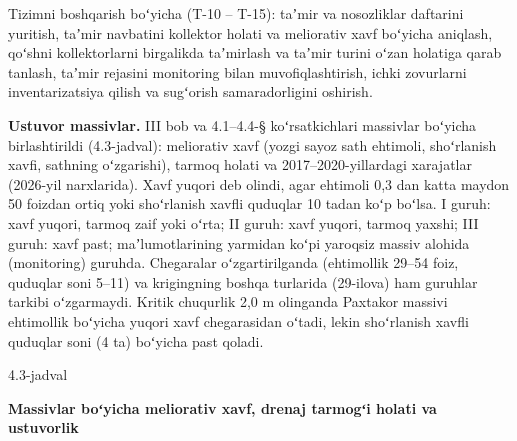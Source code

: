\documentclass[14pt,a4paper,oneside]{extreport}
\newcommand{\oakilovanom}[1]{{\centering\setstretch{1}\bfseries #1\par}\nopagebreak\vspace{2pt}}
\newcommand{\oakjadvalnum}[1]{\par\Needspace{12\baselineskip}\vspace{2pt}\noindent\hfill #1\par\nopagebreak}
\begin{document}
Tizimni boshqarish boʻyicha (T-10 -- T-15): taʼmir va nosozliklar
daftarini yuritish, taʼmir navbatini kollektor holati va meliorativ xavf
boʻyicha aniqlash, qoʻshni kollektorlarni birgalikda taʼmirlash va
taʼmir turini oʻzan holatiga qarab tanlash, taʼmir rejasini monitoring
bilan muvofiqlashtirish, ichki zovurlarni inventarizatsiya qilish va
sugʻorish samaradorligini oshirish.

\textbf{Ustuvor massivlar.} III bob va 4.1--4.4-§ koʻrsatkichlari
massivlar boʻyicha birlashtirildi (4.3-jadval): meliorativ xavf (yozgi
sayoz sath ehtimoli, shoʻrlanish xavfi, sathning oʻzgarishi), tarmoq
holati va 2017--2020-yillardagi xarajatlar (2026-yil narxlarida). Xavf
yuqori deb olindi, agar ehtimoli 0,3 dan katta maydon 50 foizdan ortiq
yoki shoʻrlanish xavfli quduqlar 10 tadan koʻp boʻlsa. I guruh: xavf
yuqori, tarmoq zaif yoki oʻrta; II guruh: xavf yuqori, tarmoq yaxshi;
III guruh: xavf past; maʼlumotlarining yarmidan koʻpi yaroqsiz massiv
alohida (monitoring) guruhda. Chegaralar oʻzgartirilganda (ehtimollik
29--54 foiz, quduqlar soni 5--11) va krigingning boshqa turlarida
(29-ilova) ham guruhlar tarkibi oʻzgarmaydi. Kritik chuqurlik 2,0 m
olinganda Paxtakor massivi ehtimollik boʻyicha yuqori xavf chegarasidan
oʻtadi, lekin shoʻrlanish xavfli quduqlar soni (4 ta) boʻyicha past
qoladi.

\oakjadvalnum{4.3-jadval}

\oakilovanom{\textbf{Massivlar boʻyicha meliorativ xavf, drenaj tarmogʻi holati va
ustuvorlik}}
\end{document}
